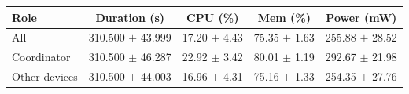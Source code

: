 \begin{tabular}{lcccc}
\hline
\textbf{Role} & \textbf{Duration (s)} & \textbf{CPU (\%)} & \textbf{Mem (\%)} & \textbf{Power (mW)} \\
\hline
All & 310.500 $\pm$ 43.999 & 17.20 $\pm$ 4.43 & 75.35 $\pm$ 1.63 & 255.88 $\pm$ 28.52 \\
Coordinator & 310.500 $\pm$ 46.287 & 22.92 $\pm$ 3.42 & 80.01 $\pm$ 1.19 & 292.67 $\pm$ 21.98 \\
Other devices & 310.500 $\pm$ 44.003 & 16.96 $\pm$ 4.31 & 75.16 $\pm$ 1.33 & 254.35 $\pm$ 27.76 \\
\hline
\end{tabular}
